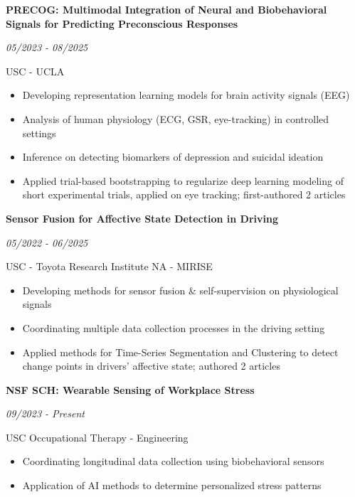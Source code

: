 \documentclass[margin]{res}
\newcommand{\cvheading}[2]{%
  \par\Needspace{4\baselineskip}\noindent
  \parbox[t]{\dimexpr\linewidth-110pt\relax}{\raggedright\bfseries #1}%
  \hfill\parbox[t]{98pt}{\raggedleft\itshape #2}%
  \par\nopagebreak[4]\vspace{-\parskip}\noindent\ignorespaces}
\begin{document}
\begin{resume}
\vspace{-1mm}
\cvheading{PRECOG: Multimodal Integration of Neural and Biobehavioral Signals for Predicting Preconscious Responses}{05/2023 - 08/2025}
USC - UCLA
\vspace{1mm}
\begin{itemize}
    \item Developing representation learning models for brain activity signals (EEG)
    \vspace{-1mm}
    \item Analysis of human physiology (ECG, GSR, eye-tracking) in controlled settings
    \vspace{-1mm}
    \item Inference on detecting biomarkers of depression and suicidal ideation
    \vspace{-1mm}
    \item Applied trial-based bootstrapping to regularize deep learning modeling of short experimental trials, applied on eye tracking; first-authored 2 articles
\end{itemize}

\vspace{-1mm}
\cvheading{Sensor Fusion for Affective State Detection in Driving}{05/2022 - 06/2025}
USC - Toyota Research Institute NA - MIRISE
\vspace{1mm}
\begin{itemize}
    \item Developing methods for sensor fusion \& self-supervision on physiological signals
    \vspace{-1mm}
    \item Coordinating multiple data collection processes in the driving setting
    \vspace{-1mm}
    \item Applied methods for Time-Series Segmentation and Clustering to detect \\ change points in drivers' affective state; authored 2 articles
\end{itemize}

\vspace{-1mm}
\cvheading{NSF SCH: Wearable Sensing of Workplace Stress}{09/2023 - Present}
USC Occupational Therapy - Engineering
\vspace{1mm}
\begin{itemize}
    \item Coordinating longitudinal data collection using biobehavioral sensors
    \vspace{-1mm}
    \item Application of AI methods to determine personalized stress patterns
\end{itemize}


\end{resume}
\end{document}

